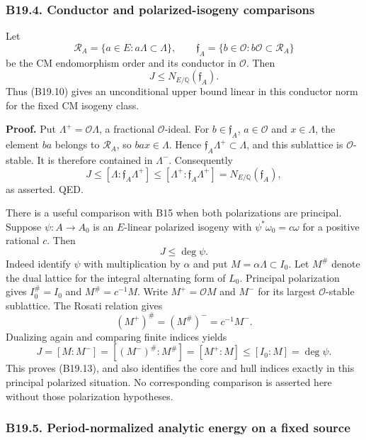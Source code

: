 \subsubsection{B19.4. Conductor and polarized-isogeny comparisons}\label{b19.4.-conductor-and-polarized-isogeny-comparisons}

Let \[
 \mathcal R_A=\{a\in E:a\Lambda\subset\Lambda\},\qquad
 \mathfrak f_A=\{b\in\mathcal O:b\mathcal O\subset\mathcal R_A\}
\] be the CM endomorphism order and its conductor in \(\mathcal O\). Then \[
 J\le N_{E/\mathbb Q}(\mathfrak f_A).
\tag{B19.12}
\] Thus (B19.10) gives an unconditional upper bound linear in this conductor norm for the fixed CM isogeny class.

\textbf{Proof.} Put \(\Lambda^+=\mathcal O\Lambda\), a fractional \(\mathcal O\)-ideal. For \(b\in\mathfrak f_A\), \(a\in\mathcal O\) and \(x\in\Lambda\), the element \(ba\) belongs to \(\mathcal R_A\), so \(bax\in\Lambda\). Hence \(\mathfrak f_A\Lambda^+\subset\Lambda\), and this sublattice is \(\mathcal O\)-stable. It is therefore contained in \(\Lambda^-\). Consequently \[
 J\le[\Lambda:\mathfrak f_A\Lambda^+]
 \le[\Lambda^+:\mathfrak f_A\Lambda^+]
 =N_{E/\mathbb Q}(\mathfrak f_A),
\] as asserted. QED.

There is a useful comparison with B15 when both polarizations are principal. Suppose \(\psi:A\to A_0\) is an \(E\)-linear polarized isogeny with \(\psi^*\omega_0=c\omega\) for a positive rational \(c\). Then \[
 J\le\deg\psi.
\tag{B19.13}
\] Indeed identify \(\psi\) with multiplication by \(\alpha\) and put \(M=\alpha\Lambda\subset I_0\). Let \(M^\#\) denote the dual lattice for the integral alternating form of \(L_0\). Principal polarization gives \(I_0^\#=I_0\) and \(M^\#=c^{-1}M\). Write \(M^+=\mathcal O M\) and \(M^-\) for its largest \(\mathcal O\)-stable sublattice. The Rosati relation gives \[
 (M^+)^\#=(M^\#)^-=c^{-1}M^-.
\] Dualizing again and comparing finite indices yields \[
 J=[M:M^-]=[(M^-)^\#:M^\#]
   =[M^+:M]\le[I_0:M]=\deg\psi.
\] This proves (B19.13), and also identifies the core and hull indices exactly in this principal polarized situation. No corresponding comparison is asserted here without those polarization hypotheses.

\subsubsection{B19.5. Period-normalized analytic energy on a fixed source}\label{b19.5.-period-normalized-analytic-energy-on-a-fixed-source}

